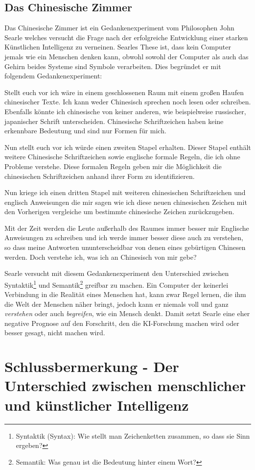 \documentclass[a4paper,12pt,german,ngerman]{report}
\begin{document}
    \section{Das Chinesische Zimmer}
    Das Chinesische Zimmer ist ein Gedankenexperiment vom Philosophen John Searle welches
    versucht die Frage nach der erfolgreiche Entwicklung einer starken Künstlichen Intelligenz zu verneinen.
    Searles These ist, dass kein Computer jemals wie ein Menschen denken kann,
    obwohl sowohl der Computer als auch das Gehirn beides Systeme sind Symbole verarbeiten.\cite{nimtz2013chinesische}
    Dies begründet er mit folgendem Gedankenexperiment:
    \begin{displayquote}
        Stellt euch vor ich wäre in einem geschlossenen Raum mit einem großen Haufen chinesischer Texte.
        Ich kann weder Chinesisch sprechen noch lesen oder schreiben.
        Ebenfalls könnte ich chinesische von keiner anderen, wie beispielweise russischer, japanischer Schrift unterscheiden.
        Chinesische Schriftzeichen haben keine erkennbare Bedeutung und sind nur Formen für mich.

        Nun stellt euch vor ich würde einen zweiten Stapel erhalten. Dieser Stapel enthält weitere
        Chinesische Schriftzeichen sowie englische formale Regeln, die ich ohne Probleme verstehe.
        Diese formalen Regeln geben mir die Möglichkeit die chinesischen Schriftzeichen
        anhand ihrer Form zu identifizieren.

        Nun kriege ich einen dritten Stapel mit weiteren chinesischen Schriftzeichen und englisch Anweisungen die mir sagen wie ich
        diese neuen chinesischen Zeichen mit den Vorherigen vergleiche um bestimmte chinesische Zeichen zurückzugeben.

        Mit der Zeit werden die Leute außerhalb des Raumes immer besser mir Englische Anweisungen zu schreiben und
        ich werde immer besser diese auch zu verstehen, so dass meine Antworten ununterscheidbar von denen eines
        gebürtigen Chinesen werden. Doch verstehe ich, was ich an Chinesisch von mir gebe?
        \cite[1]{searle1999chinese}
    \end{displayquote}
    Searle versucht mit diesem Gedankenexperiment den Unterschied zwischen
    Syntaktik\footnote{Syntaktik (Syntax): Wie stellt man Zeichenketten zusammen, so dass sie Sinn ergeben?}
    und Semantik\footnote{Semantik: Was genau ist die Bedeutung hinter einem Wort?}
    greifbar zu machen.
    Ein Computer der keinerlei Verbindung in die Realität eines Menschen hat, kann zwar Regel lernen, die ihm die
    Welt der Menschen näher bringt, jedoch kann er niemals voll und ganz \emph{verstehen} oder auch \emph{begreifen},
    wie ein Mensch denkt. Damit setzt Searle eine eher negative Prognose auf den Forschritt, den die KI-Forschung
    machen wird oder besser gesagt, nicht machen wird.

    \chapter{Schlussbermerkung - Der Unterschied zwischen menschlicher und künstlicher Intelligenz}



    \printbibliography[
        title={Quellenverzeichnis},
    ]
\end{document}
